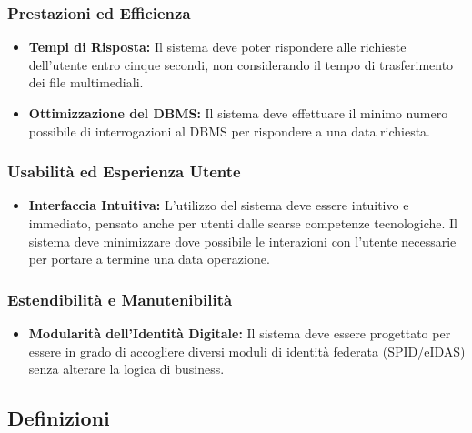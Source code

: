 \subsubsection{Prestazioni ed Efficienza}
\begin{itemize}
    \item \textbf{Tempi di Risposta:} Il sistema deve poter rispondere alle richieste dell'utente entro cinque secondi, non considerando il tempo di trasferimento dei file multimediali.
    \item \textbf{Ottimizzazione del DBMS:} Il sistema deve effettuare il minimo numero possibile di interrogazioni al DBMS per rispondere a una data richiesta.
\end{itemize}

\subsubsection{Usabilità ed Esperienza Utente}
\begin{itemize}
    \item \textbf{Interfaccia Intuitiva:} L'utilizzo del sistema deve essere intuitivo e immediato, pensato anche per utenti dalle scarse competenze tecnologiche. Il sistema deve minimizzare dove possibile le interazioni con l'utente necessarie per portare a termine una data operazione.
\end{itemize}

\subsubsection{Estendibilità e Manutenibilità}
\begin{itemize}
    \item \textbf{Modularità dell'Identità Digitale:} Il sistema deve essere progettato per essere in grado di accogliere diversi moduli di identità federata (SPID/eIDAS) senza alterare la logica di business.
\end{itemize}

\subsection{Definizioni}

